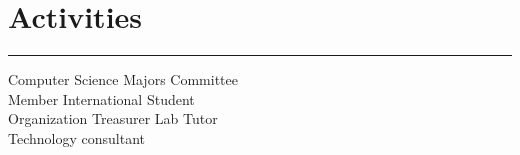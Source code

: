 \documentclass[]{dafirebanks-resume-openfont}
\begin{document}
\begin{minipage}[t]{0.33\textwidth}
\section{Activities}
\vspace{-3pt}
{\color{blue}\hrule width 78pt \vspace{5pt}}
Computer Science Majors Committee \\ Member \textbullet{} International Student \\ Organization Treasurer 
\textbullet{} Lab Tutor \\
\textbullet{} Technology consultant


%
%

\end{minipage} 
\hfill
\end{document}
